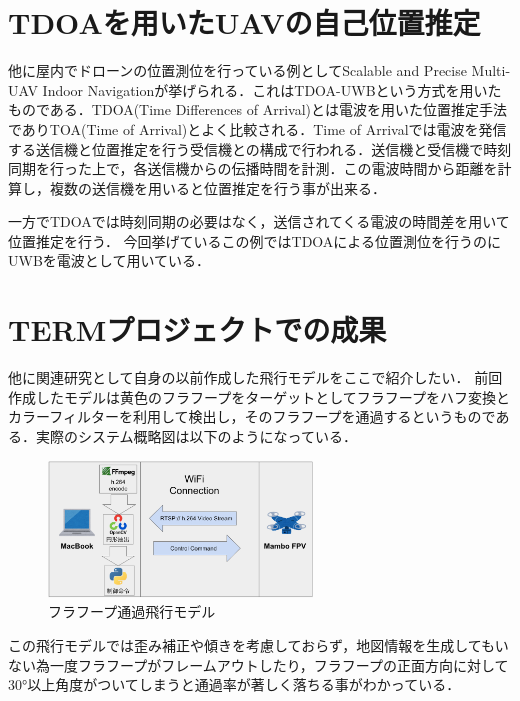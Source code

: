 \section{TDOAを用いたUAVの自己位置推定}
他に屋内でドローンの位置測位を行っている例としてScalable and Precise Multi-UAV Indoor Navigation\cite{TDOA-UWB}が挙げられる．これはTDOA-UWBという方式を用いたものである．TDOA(Time Differences of Arrival)とは電波を用いた位置推定手法でありTOA(Time of Arrival)とよく比較される．Time of Arrivalでは電波を発信する送信機と位置推定を行う受信機との構成で行われる．送信機と受信機で時刻同期を行った上で，各送信機からの伝播時間を計測．この電波時間から距離を計算し，複数の送信機を用いると位置推定を行う事が出来る．

一方でTDOAでは時刻同期の必要はなく，送信されてくる電波の時間差を用いて位置推定を行う．
今回挙げているこの例ではTDOAによる位置測位を行うのにUWBを電波として用いている．


\section{TERMプロジェクトでの成果}
他に関連研究として自身の以前作成した飛行モデルをここで紹介したい．
前回作成したモデルは黄色のフラフープをターゲットとしてフラフープをハフ変換とカラーフィルターを利用して検出し，そのフラフープを通過するというものである．実際のシステム概略図は以下のようになっている．

\begin{figure}[htbp]
  \begin{center}
    \includegraphics[clip,width=7.0cm]{img/term-system.png}
    \caption{フラフープ通過飛行モデル}
    \label{fig:hoop}
  \end{center}
\end{figure}

この飛行モデルでは歪み補正や傾きを考慮しておらず，地図情報を生成してもいない為一度フラフープがフレームアウトしたり，フラフープの正面方向に対して30°以上角度がついてしまうと通過率が著しく落ちる事がわかっている．



